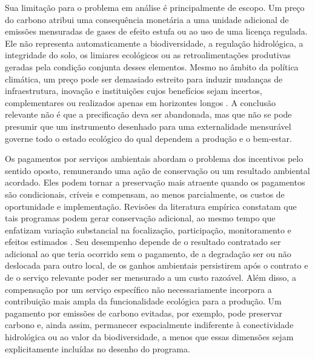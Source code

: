 Sua limitação para o problema em análise é principalmente de escopo. Um preço do carbono atribui uma consequência monetária a uma unidade adicional de emissões mensuradas de gases de efeito estufa ou ao uso de uma licença regulada. Ele não representa automaticamente a biodiversidade, a regulação hidrológica, a integridade do solo, os limiares ecológicos ou as retroalimentações produtivas geradas pela condição conjunta desses elementos. Mesmo no âmbito da política climática, um preço pode ser demasiado estreito para induzir mudanças de infraestrutura, inovação e instituições cujos benefícios sejam incertos, complementares ou realizados apenas em horizontes longos \cite{rosenbloom2020pricing}. A conclusão relevante não é que a precificação deva ser abandonada, mas que não se pode presumir que um instrumento desenhado para uma externalidade mensurável governe todo o estado ecológico do qual dependem a produção e o bem-estar.

Os pagamentos por serviços ambientais abordam o problema dos incentivos pelo sentido oposto, remunerando uma ação de conservação ou um resultado ambiental acordado. Eles podem tornar a preservação mais atraente quando os pagamentos são condicionais, críveis e compensam, ao menos parcialmente, os custos de oportunidade e implementação. Revisões da literatura empírica constatam que tais programas podem gerar conservação adicional, ao mesmo tempo que enfatizam variação substancial na focalização, participação, monitoramento e efeitos estimados \cite{borner2017effectiveness,wunder2020payments}. Seu desempenho depende de o resultado contratado ser adicional ao que teria ocorrido sem o pagamento, de a degradação ser ou não deslocada para outro local, de os ganhos ambientais persistirem após o contrato e de o serviço relevante poder ser mensurado a um custo razoável. Além disso, a compensação por um serviço específico não necessariamente incorpora a contribuição mais ampla da funcionalidade ecológica para a produção. Um pagamento por emissões de carbono evitadas, por exemplo, pode preservar carbono e, ainda assim, permanecer espacialmente indiferente à conectividade hidrológica ou ao valor da biodiversidade, a menos que essas dimensões sejam explicitamente incluídas no desenho do programa.

